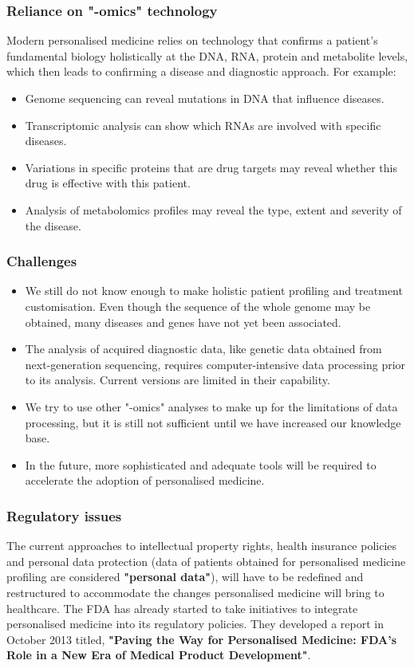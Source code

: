 \documentclass[11pt]{article}
\begin{document}
\subsubsection{Reliance on "-omics" technology}
\label{sec:org2e266f9}
Modern personalised medicine relies on technology that confirms a patient's fundamental biology holistically at the DNA, RNA, protein and metabolite levels, which then leads to confirming a disease and diagnostic approach. For example:
\begin{itemize}
\item Genome sequencing can reveal mutations in DNA that influence diseases.
\item Transcriptomic analysis can show which RNAs are involved with specific diseases.
\item Variations in specific proteins that are drug targets may reveal whether this drug is effective with this patient.
\item Analysis of metabolomics profiles may reveal the type, extent and severity of the disease.
\end{itemize}

\newpage

\subsubsection{Challenges}
\label{sec:org2fd5d8d}
\begin{itemize}
\item We still do not know enough to make holistic patient profiling and treatment customisation. Even though the sequence of the whole genome may be obtained, many diseases and genes have not yet been associated.
\item The analysis of acquired diagnostic data, like genetic data obtained from next-generation sequencing, requires computer-intensive data processing prior to its analysis. Current versions are limited in their capability.
\item We try to use other "-omics" analyses to make up for the limitations of data processing, but it is still not sufficient until we have increased our knowledge base.
\item In the future, more sophisticated and adequate tools will be required to accelerate the adoption of personalised medicine.
\end{itemize}

\subsubsection{Regulatory issues}
\label{sec:org121bfce}
The current approaches to intellectual property rights, health insurance policies and personal data protection (data of patients obtained for personalised medicine profiling are considered \textbf{"personal data"}), will have to be redefined and restructured to accommodate the changes personalised medicine will bring to healthcare.
The FDA has already started to take initiatives to integrate personalised medicine into its regulatory policies. They developed a report in October 2013 titled, \textbf{"Paving the Way for Personalised Medicine: FDA's Role in a New Era of Medical Product Development"}.
\end{document}
